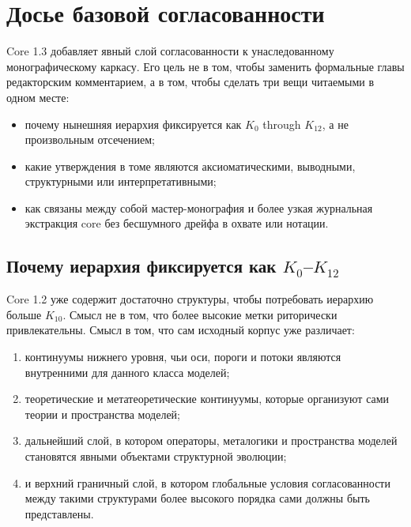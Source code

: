 \section{Досье базовой согласованности}
\label{sec:oc13-foundational-consistency}

Core 1.3 добавляет явный слой согласованности к унаследованному монографическому каркасу.
Его цель не в том, чтобы заменить формальные главы редакторским комментарием,
а в том, чтобы сделать три вещи читаемыми в одном месте:

\begin{itemize}
\item почему нынешняя иерархия фиксируется как \(K_0\) through \(K_{12}\), а
      не произвольным отсечением;
\item какие утверждения в томе являются аксиоматическими, выводными,
      структурными или интерпретативными;
\item как связаны между собой мастер-монография и более узкая журнальная
      экстракция core без бесшумного дрейфа в охвате или нотации.
\end{itemize}

\subsection{Почему иерархия фиксируется как \texorpdfstring{$K_0$--$K_{12}$}{K0-K12}}

Core 1.2 уже содержит достаточно структуры, чтобы потребовать иерархию
больше \(K_{10}\). Смысл не в том, что более высокие метки риторически
привлекательны. Смысл в том, что сам исходный корпус уже различает:

\begin{enumerate}
\item континуумы нижнего уровня, чьи оси, пороги и потоки являются внутренними
      для данного класса моделей;
\item теоретические и метатеоретические континуумы, которые организуют сами
      теории и пространства моделей;
\item дальнейший слой, в котором операторы, металогики и пространства моделей
      становятся явными объектами структурной эволюции;
\item и верхний граничный слой, в котором глобальные условия согласованности
      между такими структурами более высокого порядка сами должны быть
      представлены.
\end{enumerate}

